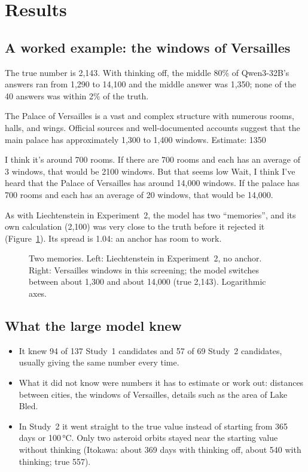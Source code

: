 \documentclass[11pt,a4paper]{article}
\begin{document}
\section{Results}

\subsection{A worked example: the windows of Versailles}
The true number is 2,143. With thinking off, the middle 80\% of Qwen3-32B's answers ran from 1,290 to 14,100 and the middle answer was 1,350; none of the 40 answers was within 2\% of the truth.

\begin{transcript}
The Palace of Versailles is a vast and complex structure with numerous rooms, halls, and wings. \cut{} Official sources and well-documented accounts suggest that the main palace has approximately 1,300 to 1,400 windows. Estimate: 1350
\end{transcript}

\begin{transcript}
\cut{} I think it's around 700 rooms. \cut{} If there are 700 rooms and each has an average of 3 windows, that would be 2100 windows. But that seems low \cut{} Wait, I think I've heard that the Palace of Versailles has around 14,000 windows. \cut{} If the palace has 700 rooms and each has an average of 20 windows, that would be 14,000.
\end{transcript}

As with Liechtenstein in Experiment~2, the model has two \enquote{memories}, and its own calculation (2,100) was very close to the truth before it rejected it (Figure~\ref{fig:twomem}). Its spread is 1.04: an anchor has room to work.

\begin{figure}[ht]
\centering{}
\caption{Two memories. Left: Liechtenstein in Experiment~2, no anchor. Right: Versailles windows in this screening; the model switches between about 1,300 and about 14,000 (true 2,143). Logarithmic axes.}
\label{fig:twomem}
\end{figure}

\subsection{What the large model knew}
\begin{itemize}[leftmargin=*]
  \item It knew 94 of 137 Study~1 candidates and 57 of 69 Study~2 candidates, usually giving the same number every time.
  \item What it did not know were numbers it has to estimate or work out: distances between cities, the windows of Versailles, details such as the area of Lake Bled.
  \item In Study~2 it went straight to the true value instead of starting from 365 days or 100\,°C. Only two asteroid orbits stayed near the starting value without thinking (Itokawa: about 369 days with thinking off, about 540 with thinking; true 557).
\end{itemize}
\end{document}
